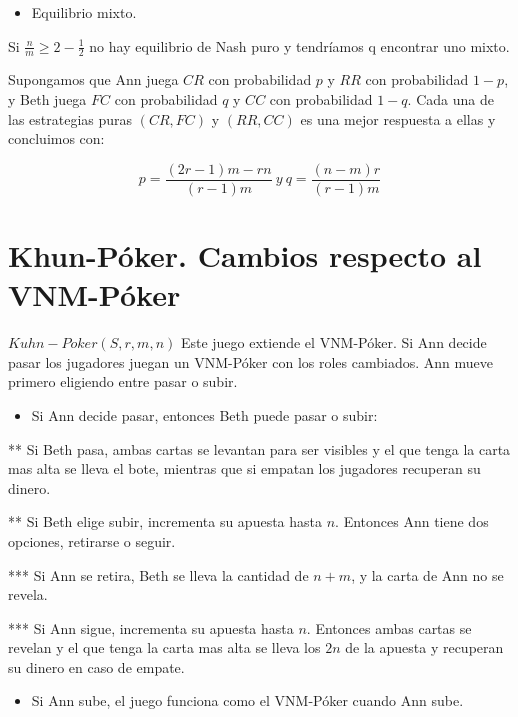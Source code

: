 \documentclass[12pt,a4paper,]{book}
\providecommand{\tightlist}{%
  \setlength{\itemsep}{0pt}\setlength{\parskip}{0pt}}
\numberwithin{dummy}{section}
\theoremstyle{ocrenumbox}
\theoremstyle{blacknumex}
\theoremstyle{blacknumbox}
\theoremstyle{ocrenum}
\theoremstyle{ocrenum}
\begin{document}
\begin{itemize}
\tightlist
\item
  Equilibrio mixto.
\end{itemize}

Si \(\frac{n}{m} \geq 2- \frac{1}{2}\) no hay equilibrio de Nash puro y
tendríamos q encontrar uno mixto.

Supongamos que Ann juega \(CR\) con probabilidad \(p\) y \(RR\) con
probabilidad \(1-p\), y Beth juega \(FC\) con probabilidad \(q\) y
\(CC\) con probabilidad \(1-q\). Cada una de las estrategias puras
\((CR,FC)\) y \((RR,CC)\) es una mejor respuesta a ellas y concluimos
con:

\[
p=\frac{(2r-1)m-rn}{(r-1)m} \ y \ q=\frac{(n-m)r}{(r-1)m}
\]

\hypertarget{Seccion52}{%
\section{Khun-Póker. Cambios respecto al VNM-Póker}\label{Seccion52}}

\textbf{\(Kuhn-Poker(S,r,m,n)\)} Este juego extiende el VNM-Póker. Si
Ann decide pasar los jugadores juegan un VNM-Póker con los roles
cambiados. Ann mueve primero eligiendo entre pasar o subir.

\begin{itemize}
\tightlist
\item
  Si Ann decide pasar, entonces Beth puede pasar o subir:
\end{itemize}

** Si Beth pasa, ambas cartas se levantan para ser visibles y el que
tenga la carta mas alta se lleva el bote, mientras que si empatan los
jugadores recuperan su dinero.

** Si Beth elige subir, incrementa su apuesta hasta \(n\). Entonces Ann
tiene dos opciones, retirarse o seguir.

*** Si Ann se retira, Beth se lleva la cantidad de \(n+m\), y la carta
de Ann no se revela.

*** Si Ann sigue, incrementa su apuesta hasta \(n\). Entonces ambas
cartas se revelan y el que tenga la carta mas alta se lleva los \(2n\)
de la apuesta y recuperan su dinero en caso de empate.

\begin{itemize}
\tightlist
\item
  Si Ann sube, el juego funciona como el VNM-Póker cuando Ann sube.
\end{itemize}
\end{document}
